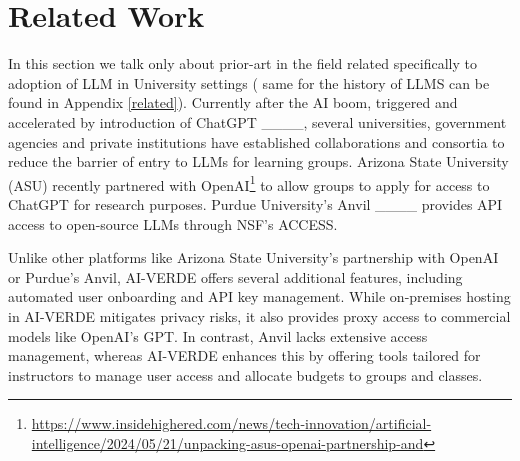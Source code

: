 \section{Related Work}
In this section we talk only about prior-art in the field  related specifically to adoption of LLM in University settings ( same for the history of  LLMS can be found in Appendix \ref{related}). Currently after the AI boom,  triggered and accelerated by introduction of ChatGPT ____,  several universities, government agencies and private institutions have established collaborations and consortia to reduce the barrier of entry to LLMs for learning groups. Arizona State University (ASU) recently partnered with OpenAI\footnote{\url{https://www.insidehighered.com/news/tech-innovation/artificial-intelligence/2024/05/21/unpacking-asus-openai-partnership-and}} to allow groups to apply for access to ChatGPT for research purposes. Purdue University's Anvil ____ provides API access to open-source LLMs through NSF's ACCESS. 


Unlike other platforms like Arizona State University’s partnership with OpenAI or Purdue’s Anvil, AI-VERDE offers several additional features, including automated user onboarding and API key management. While on-premises hosting in AI-VERDE mitigates privacy risks, it also provides proxy access to commercial models like OpenAI's GPT. In contrast, Anvil lacks extensive access management, whereas AI-VERDE enhances this by offering tools tailored for instructors to manage user access and allocate budgets to groups and classes.




%